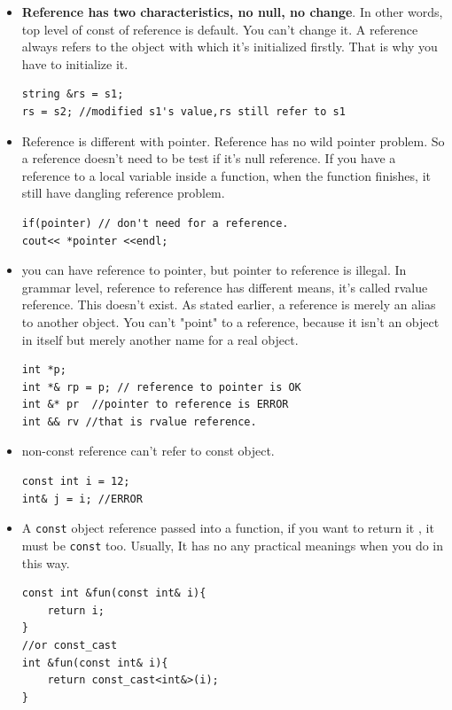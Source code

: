 \documentclass[a4paper,11pt,twoside]{book}
\begin{document}
\begin{itemize}
    \item \textbf{Reference has two characteristics, no null, no change}. In other words, top level of const of reference is default. You can't change it. A reference always refers to the object with which it's initialized firstly. That is why you have to initialize it.
\begin{lstlisting}[numbers = none]
string &rs = s1;
rs = s2; //modified s1's value,rs still refer to s1
\end{lstlisting}

    \item Reference is different with pointer. Reference has no wild pointer problem. So a reference doesn't need to be test if it's null reference. If you have a reference to a local variable inside a function, when the function finishes, it still have dangling reference problem. 
\begin{lstlisting}[numbers=none]
if(pointer) // don't need for a reference.
cout<< *pointer <<endl;
\end{lstlisting}

    \item you can have reference to pointer, but pointer to reference is illegal. In grammar level, reference to reference has different means, it's called rvalue reference. This doesn't exist. As stated earlier, a reference is merely an alias to another object. You can't "point" to a reference, because it isn't an object in itself but merely another name for a real object. 
\begin{lstlisting}[numbers=none]
int *p;
int *& rp = p; // reference to pointer is OK
int &* pr  //pointer to reference is ERROR
int && rv //that is rvalue reference.
\end{lstlisting}


\item non-const reference can't refer to const object.
\begin{lstlisting}[numbers=none]
const int i = 12;
int& j = i; //ERROR
\end{lstlisting}

\item A \texttt{const} object reference passed into a function, if you want to return it , it must be \texttt{const} too. Usually, It has no any practical meanings when you do in this way. 
\begin{lstlisting}[numbers=none]
const int &fun(const int& i){ 
	return i;
}
//or const_cast 
int &fun(const int& i){ 
	return const_cast<int&>(i);
}
\end{lstlisting}


\end{itemize}
\end{document}
